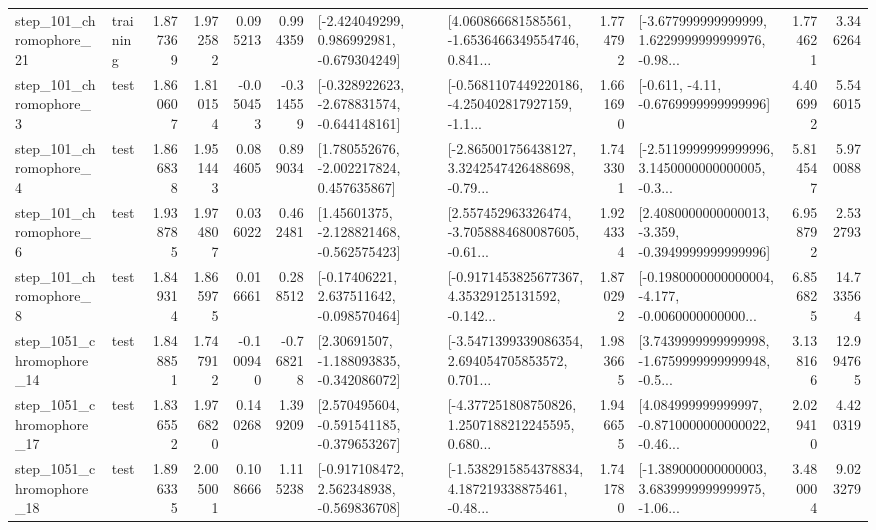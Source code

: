 \begin{tabular}{llrrrrllrlrr}
  step\_101\_chromophore\_21 &  training &      1.877369 &    1.972582 &      0.095213 &  0.994359 &   [-2.424049299, 0.986992981, -0.679304249] &  [4.060866681585561, -1.6536466349554746, 0.841... &       1.774792 &  [-3.677999999999999, 1.6229999999999976, -0.98... &            1.774621 &          3.346264 \\
   step\_101\_chromophore\_3 &      test &      1.860607 &    1.810154 &     -0.050453 & -0.314559 &  [-0.328922623, -2.678831574, -0.644148161] &  [-0.5681107449220186, -4.250402817927159, -1.1... &       1.661690 &               [-0.611, -4.11, -0.6769999999999996] &            4.406992 &          5.546015 \\
   step\_101\_chromophore\_4 &      test &      1.866838 &    1.951443 &      0.084605 &  0.899034 &    [1.780552676, -2.002217824, 0.457635867] &  [-2.865001756438127, 3.3242547426488698, -0.79... &       1.743301 &  [-2.5119999999999996, 3.1450000000000005, -0.3... &            5.814547 &          5.970088 \\
   step\_101\_chromophore\_6 &      test &      1.938785 &    1.974807 &      0.036022 &  0.462481 &    [1.45601375, -2.128821468, -0.562575423] &  [2.557452963326474, -3.7058884680087605, -0.61... &       1.924334 &  [2.4080000000000013, -3.359, -0.3949999999999996] &            6.958792 &          2.532793 \\
   step\_101\_chromophore\_8 &      test &      1.849314 &    1.865975 &      0.016661 &  0.288512 &    [-0.17406221, 2.637511642, -0.098570464] &  [-0.9171453825677367, 4.35329125131592, -0.142... &       1.870292 &  [-0.1980000000000004, -4.177, -0.0060000000000... &            6.856825 &         14.733564 \\
 step\_1051\_chromophore\_14 &      test &      1.848851 &    1.747912 &     -0.100940 & -0.768218 &    [2.30691507, -1.188093835, -0.342086072] &  [-3.5471399339086354, 2.694054705853572, 0.701... &       1.983665 &  [3.7439999999999998, -1.6759999999999948, -0.5... &            3.138166 &         12.994765 \\
 step\_1051\_chromophore\_17 &      test &      1.836552 &    1.976820 &      0.140268 &  1.399209 &   [2.570495604, -0.591541185, -0.379653267] &  [-4.377251808750826, 1.2507188212245595, 0.680... &       1.946655 &  [4.084999999999997, -0.8710000000000022, -0.46... &            2.029410 &          4.420319 \\
 step\_1051\_chromophore\_18 &      test &      1.896335 &    2.005001 &      0.108666 &  1.115238 &   [-0.917108472, 2.562348938, -0.569836708] &  [-1.5382915854378834, 4.187219338875461, -0.48... &       1.741780 &  [-1.389000000000003, 3.6839999999999975, -1.06... &            3.480004 &          9.023279 \\

\end{tabular}
